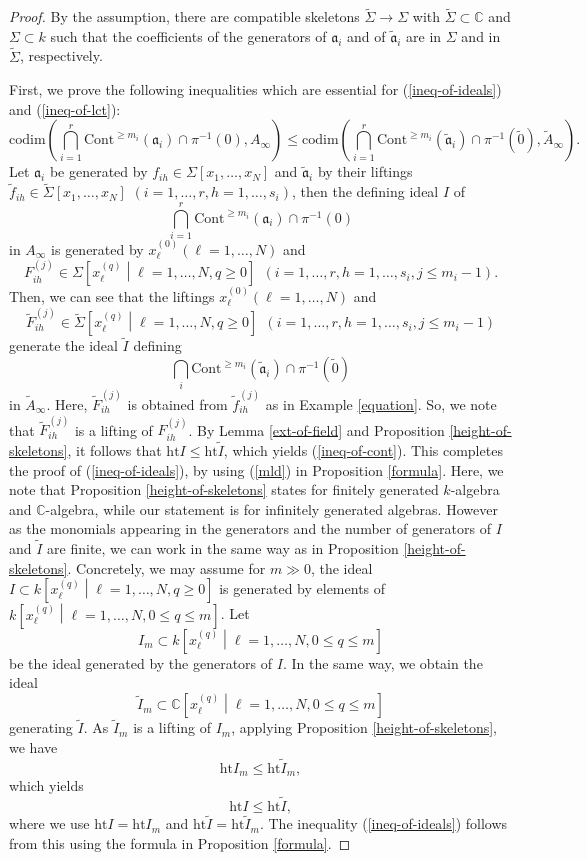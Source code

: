 \documentclass[a4paper]{amsart}
\def\CC{{\mathbb{C}}}
\renewcommand{\a}{{\mathfrak{a}}}
\newcommand{\cont}{{\mathrm{Cont}}}
\newcommand{\codim}{{\mathrm{codim}}}
\newcommand{\wI}{{\widetilde{I}}}
\newcommand{\height}{{\mathrm{ht} }}
\newcommand{\tf}{{\tilde f}}
\newcommand{\taa}{{\widetilde{\mathfrak a}}}
\newcommand{\wa}{{\widetilde{A}}}
\newcommand{\wsig}{{\widetilde{\Sigma}}}
\newcommand{\tze}{{\tilde 0}}
\theoremstyle{definition}
\begin{document}
\begin{proof} By the assumption, there are compatible skeletons $\widetilde\Sigma \to \Sigma$  with $\widetilde\Sigma\subset \CC$ and $\Sigma\subset k$ such that the coefficients of the  generators of $\a_i$ and of $\taa_i$ are 
in $\Sigma$ and in $\widetilde\Sigma$, respectively.

 First, we prove the following inequalities which are essential for (\ref{ineq-of-ideals}) and (\ref{ineq-of-lct}):
\begin{equation}\label{ineq-of-cont}
\codim\left(\bigcap_{i=1}^r \cont^{\geq m_i}(\a_i)\cap \pi^{-1}(0), A_\infty\right)\leq 
\codim\left(\bigcap_{i=1}^r \cont^{\geq m_i}(\taa_i)\cap \pi^{-1}(\tze), \wa_\infty\right).
\end{equation}
 Let $\a_i$ be generated by $f_{ih} \in \Sigma[x_1,\ldots,x_N]$
and $\taa_i$ by their liftings $\tf_{ih} \in \wsig[x_1,\ldots,x_N]$ $(i=1,\ldots, r, h=1,\ldots, s_i)$,
then the defining ideal $I$ of $$\bigcap_{i=1}^r \cont^{\geq m_i}(\a_i)\cap \pi^{-1}(0)$$
in $A_\infty$  is generated by $x_\ell^{(0)} (\ell =1,\ldots, N)$ and
$$F_{ih}^{(j)}\in \Sigma\left[x_\ell^{(q)}\middle| \ell=1,\ldots, N, q\geq0\right]\ \ (i=1,\ldots, r, h=1,\ldots, s_i,  j\leq m_i-1).$$
Then, we can see that the liftings $x_\ell^{(0)} (\ell =1,\ldots, N)$ and
$$\widetilde F_{ih}^{(j)} \in \widetilde\Sigma\left[x_\ell^{(q)}\middle| \ell=1,\ldots, N, q\geq0\right]\ \   (i=1,\ldots, r, h=1,\ldots, s_i,  j\leq m_i-1)$$ generate the ideal 
$\widetilde I $ defining 
$$\bigcap_i \cont^{\geq m_i}(\taa_i)\cap \pi^{-1}(\tze)$$
in $\wa_\infty$.
Here, $\widetilde F_{ih}^{(j)}$ is obtained from $\widetilde f_{ih}^{(j)}$ as in Example \ref{equation}.
So, we note that
$\widetilde F_{ih}^{(j)}$ is a lifting of $F_{ih}^{(j)}$.
By Lemma \ref{ext-of-field} and  Proposition \ref{height-of-skeletons},
 it follows that $\height I \leq \height \widetilde I$,
which yields (\ref{ineq-of-cont}).
This completes the proof of (\ref{ineq-of-ideals}), by using (\ref{mld}) in Proposition \ref{formula}.
Here, we note that Proposition \ref{height-of-skeletons} states for finitely generated $k$-algebra and $\CC$-algebra,
while our statement is for infinitely generated algebras.
However as the monomials appearing in the generators and the number of generators of $I$ and $\widetilde I$ are finite,
we can work in the same way as in Proposition \ref{height-of-skeletons}.
%
Concretely, we may assume for $m\gg0$, the ideal $I\subset k\left[x_\ell^{(q)}\middle| \ell=1,\ldots, N, q\geq0\right]$
is generated by elements of $k\left[x_\ell^{(q)}\middle| \ell=1,\ldots, N, 0\leq q\leq m\right]$.
Let 
$$I_m\subset k\left[x_\ell^{(q)}\middle| \ell=1,\ldots, N, 0\leq q\leq m \right]$$
be the ideal generated by the generators of $I$.
In the same way, we obtain the ideal
$$\wI_m \subset \CC\left[x_\ell^{(q)}\middle| \ell=1,\ldots, N, 0\leq q\leq m \right]$$
generating $\wI$.
As $\wI_m$ is a lifting of $I_m$, applying Proposition \ref{height-of-skeletons}, we have
$$\height I_m\leq \height \wI_m,$$
which yields 
$$\height I\leq \height \wI,$$ 
where we use $\height I=\height I_m$ and $\height \wI=\height \wI_m$.
The inequality (\ref{ineq-of-ideals}) follows from this using the formula in Proposition \ref{formula}.


\end{proof}
\end{document}

